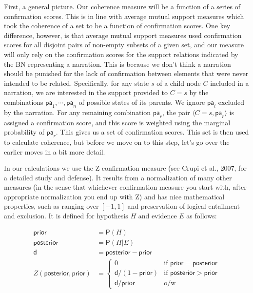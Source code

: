 \documentclass[10pt,]{scrartcl}
\newcommand{\ra}{\rangle}
\newcommand{\la}{\langle}
\newcommand{\pr}{\mathsf{P}}
\newcommand{\s}[1]{\mbox{\textsf{#1}}}
\begin{document}
First, a general picture. Our coherence measure will be a function of a
series of confirmation scores. This is in line with average mutual
support measures which took the coherence of a set to be a function of
confirmation scores. One key difference, however, is that average mutual
support measures used confirmation scores for all disjoint pairs of
non-empty subsets of a given set, and our measure will only rely on the
confirmation scores for the support relations indicated by the BN
representing a narration. This is because we don't think a narration
should be punished for the lack of confirmation between elements that
were never intended to be related. Specifically, for any state \(s\) of
a child node \(C\) included in a narration, we are interested in the
support provided to \(C=s\) by the combinations
\(\mathsf{pa}_1, \cdots, \mathsf{pa}_n\) of possible states of its
parents. We ignore \(\mathsf{pa}_i\) excluded by the narration. For any
remaining combination \(\mathsf{pa}_r\), the pair
\(\la C=s, \mathsf{pa}_r\ra\) is assigned a confirmation score, and this
score is weighted using the marginal probability of \(\mathsf{pa}_r\).
This gives us a set of confirmation scores. This set is then used to
calculate coherence, but before we move on to this step, let's go over
the earlier moves in a bit more detail.

In our calculations we use the \s{Z} confirmation measure (see Crupi et
al., 2007, for a detailed study and defense). It results from a
normalization of many other measures (in the sense that whichever
confirmation measure you start with, after appropriate normalization you
end up with \s{Z}) and has nice mathematical properties, such as ranging
over \([-1,1]\) and preservation of logical entailment and exclusion. It
is defined for hypothesis \(H\) and evidence \(E\) as follows:

\begin{align*}
   \mathsf{prior} & = \pr(H) \\
   \mathsf{posterior} & = \pr(H \vert E)\\
   \mathsf{d} & = \mathsf{posterior} - \mathsf{prior} \\
       Z(\mathsf{posterior,prior}) & =  \begin{cases}
       0 & \text{if } \mathsf{prior} = \mathsf{posterior}\\
       \mathsf{d}/(1-\mathsf{prior}) & \text{if } \mathsf{posterior} > \mathsf{prior} \\
         \mathsf{d}/\mathsf{prior} & \text{o/w} 
       \end{cases}
   \end{align*}
\end{document}

